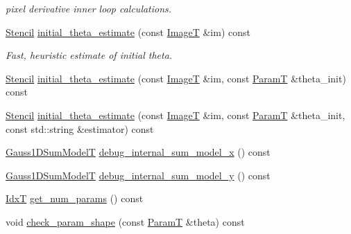 \begin{DoxyCompactItemize}
\begin{DoxyCompactList}\small\item\em pixel derivative inner loop calculations. \end{DoxyCompactList}\item 
\hyperlink{classmappel_1_1Gauss2DsModel_1_1Stencil}{Stencil} \hyperlink{classmappel_1_1Gauss2DsModel_a161d46578c6796a7ac669ec8971e89e1}{initial\+\_\+theta\+\_\+estimate} (const \hyperlink{classmappel_1_1ImageFormat2DBase_a667ea5016648958e507e7db8eaa041b0}{ImageT} \&im) const 
\begin{DoxyCompactList}\small\item\em Fast, heuristic estimate of initial theta. \end{DoxyCompactList}\item 
\hyperlink{classmappel_1_1Gauss2DsModel_1_1Stencil}{Stencil} \hyperlink{classmappel_1_1Gauss2DsModel_a20678f6114e65815916aa53937ee5d80}{initial\+\_\+theta\+\_\+estimate} (const \hyperlink{classmappel_1_1ImageFormat2DBase_a667ea5016648958e507e7db8eaa041b0}{ImageT} \&im, const \hyperlink{classmappel_1_1PointEmitterModel_a665ec6aea3aac139bb69a23c06d4b9a1}{ParamT} \&theta\+\_\+init) const 
\item 
\hyperlink{classmappel_1_1Gauss2DsModel_1_1Stencil}{Stencil} \hyperlink{classmappel_1_1Gauss2DsModel_ab268b65a61ef6879b72daf20419ad0cd}{initial\+\_\+theta\+\_\+estimate} (const \hyperlink{classmappel_1_1ImageFormat2DBase_a667ea5016648958e507e7db8eaa041b0}{ImageT} \&im, const \hyperlink{classmappel_1_1PointEmitterModel_a665ec6aea3aac139bb69a23c06d4b9a1}{ParamT} \&theta\+\_\+init, const std\+::string \&estimator) const 
\item 
\hyperlink{classmappel_1_1Gauss2DsModel_a23ae68443a62f76405e6f08f6dec4fb7}{Gauss1\+D\+Sum\+ModelT} \hyperlink{classmappel_1_1Gauss2DsModel_a94ce8fb5e93ba7607f75090e1fe9fe7e}{debug\+\_\+internal\+\_\+sum\+\_\+model\+\_\+x} () const 
\item 
\hyperlink{classmappel_1_1Gauss2DsModel_a23ae68443a62f76405e6f08f6dec4fb7}{Gauss1\+D\+Sum\+ModelT} \hyperlink{classmappel_1_1Gauss2DsModel_a2ce4737beb88367daeb480bf471ad2cf}{debug\+\_\+internal\+\_\+sum\+\_\+model\+\_\+y} () const 
\item 
\hyperlink{namespacemappel_ab17ec0f30b61ece292439d7ece81d3a8}{IdxT} \hyperlink{classmappel_1_1PointEmitterModel_a6fe8129bd24ab5c6620b3ab106b6c91a}{get\+\_\+num\+\_\+params} () const 
\item 
void \hyperlink{classmappel_1_1PointEmitterModel_a97a868e842302f670ed9f9bd49416771}{check\+\_\+param\+\_\+shape} (const \hyperlink{classmappel_1_1PointEmitterModel_a665ec6aea3aac139bb69a23c06d4b9a1}{ParamT} \&theta) const 

\end{DoxyCompactItemize}
